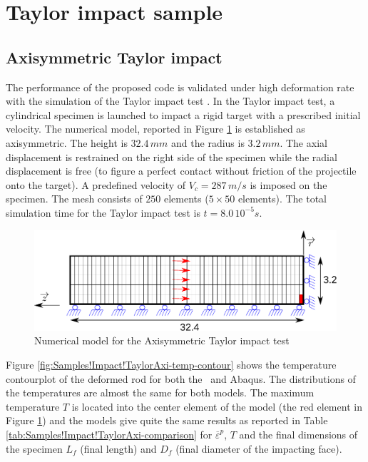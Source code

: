 \section{Taylor impact sample}

\subsection{Axisymmetric Taylor impact}

The performance of the proposed code is validated under high deformation
rate with the simulation of the Taylor impact test \cite{taylor1946james}.
In the Taylor impact test, a cylindrical specimen is launched to impact
a rigid target with a prescribed initial velocity. The numerical model,
reported in Figure \ref{fig:Samples!Impact!TaylorAxi} is established
as axisymmetric. The height is $32.4\,mm$ and the radius is $3.2\,mm$.
The axial displacement is restrained on the right side of the specimen
while the radial displacement is free (to figure a perfect contact
without friction of the projectile onto the target). A predefined
velocity of $V_{c}=287\,m/s$ is imposed on the specimen. The mesh
consists of $250$ elements ($5\times50$ elements). The total simulation
time for the Taylor impact test is $t=8.0\,10^{-5}s$.

\begin{figure}[h]
\begin{centering}
\includegraphics[width=0.75\columnwidth]{Figures/TaylorAxi}
\par\end{centering}
\caption{Numerical model for the Axisymmetric Taylor impact test\label{fig:Samples!Impact!TaylorAxi}}
\end{figure}

Figure \ref{fig:Samples!Impact!TaylorAxi-temp-contour} shows the
temperature contourplot of the deformed rod for both the \DynELA~and
Abaqus. The distributions of the temperatures are almost the same
for both models. The maximum temperature $T$ is located into the
center element of the model (the red element in Figure \ref{fig:Samples!Impact!TaylorAxi})
and the models give quite the same results as reported in Table \ref{tab:Samples!Impact!TaylorAxi-comparison}
for $\overline{\varepsilon}^{p}$, $T$ and the final dimensions of
the specimen $L_{f}$ (final length) and $D_{f}$ (final diameter
of the impacting face). 

